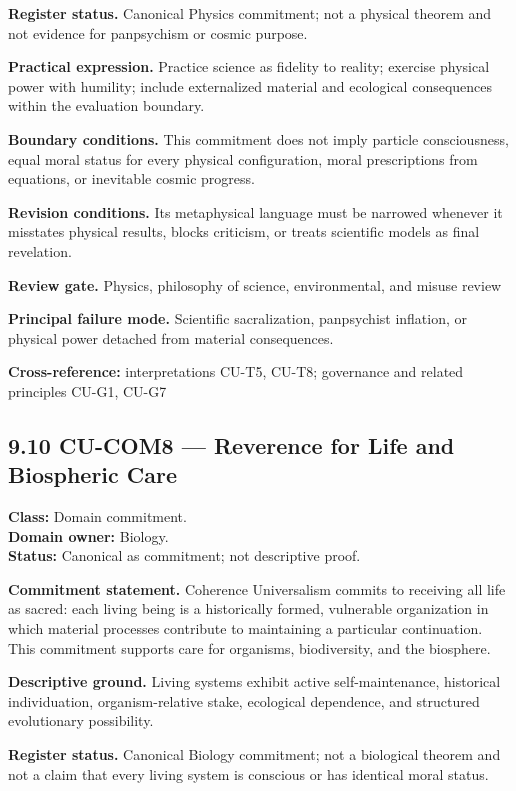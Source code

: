 \documentclass[
  11pt,
]{article}
\begin{document}
\textbf{Register status.} Canonical Physics commitment; not a physical
theorem and not evidence for panpsychism or cosmic purpose.

\textbf{Practical expression.} Practice science as fidelity to reality;
exercise physical power with humility; include externalized material and
ecological consequences within the evaluation boundary.

\textbf{Boundary conditions.} This commitment does not imply particle
consciousness, equal moral status for every physical configuration,
moral prescriptions from equations, or inevitable cosmic progress.

\textbf{Revision conditions.} Its metaphysical language must be narrowed
whenever it misstates physical results, blocks criticism, or treats
scientific models as final revelation.

\textbf{Review gate.} Physics, philosophy of science, environmental, and
misuse review

\textbf{Principal failure mode.} Scientific sacralization, panpsychist
inflation, or physical power detached from material consequences.

\textbf{Cross-reference:} interpretations CU-T5, CU-T8; governance and
related principles CU-G1, CU-G7

\subsection{9.10 CU-COM8 --- Reverence for Life and Biospheric
Care}\label{cu-com8-reverence-for-life-and-biospheric-care}

\textbf{Class:} Domain commitment.\\
\textbf{Domain owner:} Biology.\\
\textbf{Status:} Canonical as commitment; not descriptive proof.

\textbf{Commitment statement.} Coherence Universalism commits to
receiving all life as sacred: each living being is a historically
formed, vulnerable organization in which material processes contribute
to maintaining a particular continuation. This commitment supports care
for organisms, biodiversity, and the biosphere.

\textbf{Descriptive ground.} Living systems exhibit active
self-maintenance, historical individuation, organism-relative stake,
ecological dependence, and structured evolutionary possibility.

\textbf{Register status.} Canonical Biology commitment; not a biological
theorem and not a claim that every living system is conscious or has
identical moral status.
\end{document}
